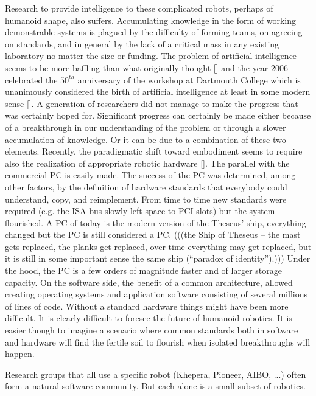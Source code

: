 %
Research to provide intelligence to these complicated robots, perhaps
of humanoid shape, also suffers. Accumulating knowledge 
in the form of working demonstrable systems is plagued by the   
difficulty of forming teams, on agreeing on standards, and in 
general by the lack of a critical mass in any existing laboratory no 
matter the size or funding. The problem of artificial intelligence seems
to be more baffling than what originally thought \ref{} and the year 2006 
celebrated the $50^{th}$ anniversary of the workshop at Dartmouth College
which is unanimously considered the birth of artificial intelligence at 
least in some modern sense \ref{}. %
A generation of researchers did not manage to make the progress that was
certainly hoped for. Significant progress can certainly be made either 
because of a breakthrough in our understanding of the problem or through 
a slower accumulation of knowledge. Or it can be due to a combination of 
these two elements. Recently, the paradigmatic shift toward embodiment 
seems to require also the realization of appropriate robotic hardware \ref{}. 
The parallel with the commercial PC is easily made. The success of the PC was
determined, among other factors, by the definition of hardware standards
that everybody could understand, copy, and reimplement. From time
to time new standards were required (e.g. the ISA bus slowly left
space to PCI slots) but the system flourished. A PC of today is the modern 
version of the Theseus' ship, everything changed but the PC is still considered
a PC. 
%
(((the Ship of Theseus -- the mast gets replaced,
the planks get replaced, over time everything may get replaced,
but it is still in some important sense the same ship (``paradox
of identity'').)))
%
Under the hood, the PC is a few orders of magnitude faster and of larger
storage capacity. On the software side, the benefit of a common architecture, 
allowed creating operating systems and application software consisting of 
several millions of lines of code. Without a standard hardware things
might have been more difficult.
It is clearly difficult to foresee the future of humanoid robotics. It is
easier though to imagine a scenario where common standards both in software and
hardware will find the fertile soil to flourish when isolated breakthroughs 
will happen.



Research groups that all use a specific robot (Khepera, Pioneer, AIBO,
...) often form a natural software community.  But each alone is 
a small subset of robotics.

